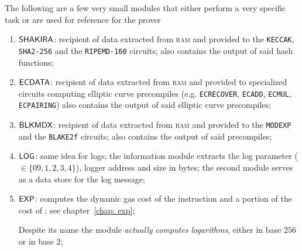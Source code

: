 The following are a few very small modules that either perform a very specific task or are used for reference for the prover
\begin{enumerate}[resume]
	\item $\textsf{SHAKIRA}$:
		recipient of data extracted from \textsc{ram} and provided to the \texttt{KECCAK}, \texttt{SHA2-256} and the \texttt{RIPEMD-160} circuits;
		also contains the output of said hash functions;
	\item $\textsf{ECDATA}$:
		recipient of data extracted from \textsc{ram} and provided to specialized circuits computing elliptic curve precompiles (e.g. \texttt{ECRECOVER}, \texttt{ECADD}, \texttt{ECMUL}, \texttt{ECPAIRING})
		also contains the output of said elliptic curve precompiles;
	\item $\textsf{BLKMDX}$:
		recipient of data extracted from \textsc{ram} and provided to the \texttt{MODEXP} and the \texttt{BLAKE2f} circuits;
		also contains the output of said precompiles;
	\item $\textsf{LOG}{}$:
		same idea for logs;
		the information module extracts the log parameter ($\in\{09,1,2,3,4\}$), logger address and size in bytes;
		the second module serves as a data store for the log message;
	\item $\textsf{EXP}{}$:
		computes the dynamic gas cost of the  instruction and a portion of the cost of ;
		see chapter~\ref{chap: exp};

		\saNote{} Despite its name the \expMod{} module \emph{actually computes logarithms}, either in base $256$ or in base $2$;
\end{enumerate}

